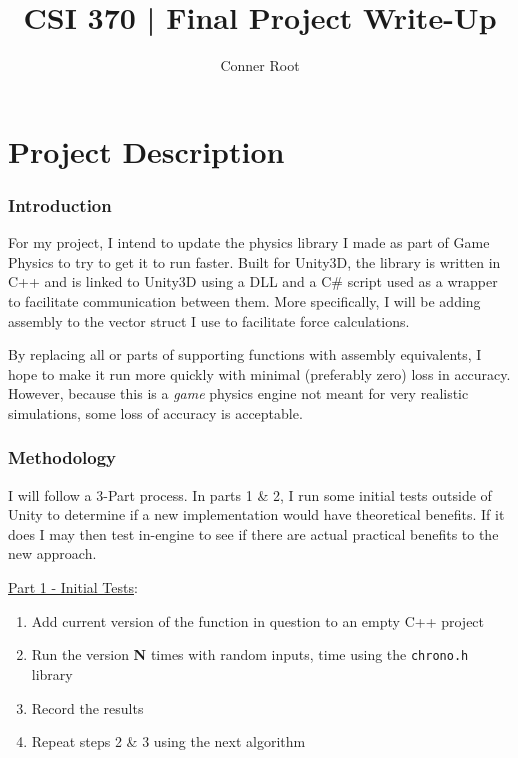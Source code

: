 \documentclass{article}
\date{}
\title{\vspace{-0.5in} CSI 370 | Final Project Write-Up}
\author{Conner Root }
\newcommand{\code}[1]{\colorbox{light-gray}{\texttt{#1}}}
\begin{document}
\maketitle

\tableofcontents

\part{Project Description}

\section{Introduction}

For my project, I intend to update the physics library I made as part of Game Physics to try to get it to run faster. Built for Unity3D, the library is written in C++ and is linked to Unity3D using a DLL and a C\# script used as a wrapper to facilitate communication between them. More specifically, I will be adding assembly to the vector struct I use to facilitate force calculations.

\vspace{3mm}

By replacing all or parts of supporting functions with assembly equivalents, I hope to make it run more quickly with minimal (preferably zero) loss in accuracy. However, because this is a \textit{game} physics engine not meant for very realistic simulations, some loss of accuracy is acceptable.

\section{Methodology}

I will follow a 3-Part process. In parts 1 \& 2, I run some initial tests outside of Unity to determine if a new implementation would have theoretical benefits. If it does I may then test in-engine to see if there are actual practical benefits to the new approach.

\vspace{3mm} %

\noindent \underline{Part 1 - Initial Tests}:

\begin{enumerate}
\item Add current version of the function in question to an empty C++ project
\item Run the version \textbf{N} times with random inputs, time using the \code{chrono.h} library
\item Record the results
\item Repeat steps 2 \& 3 using the next algorithm
\end{enumerate}
\end{document}
